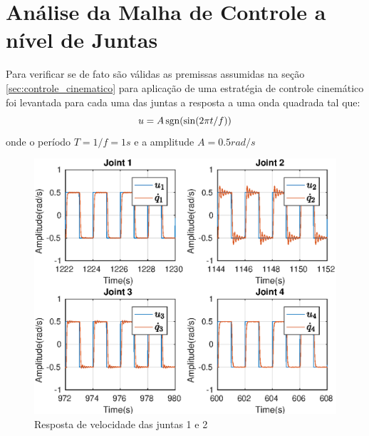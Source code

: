 \section{Análise da Malha de Controle a nível de Juntas}
Para verificar se de fato são válidas as premissas assumidas na seção \ref{sec:controle_cinematico} para aplicação de uma estratégia de controle cinemático foi levantada para cada uma das juntas a resposta a uma onda quadrada tal que:
\[ u = A \operatorname{sgn}(\sin( 2\pi t/f)) \]
onde o período $T = 1/f = 1s$ e a amplitude $A = 0.5 rad/s$

\newlength{\imageheight}
\begin{figure}[H]
  \centering
    \includegraphics[width=\textwidth, clip=true, trim = 0 0.5\imageheight 0 0 0 mm]{./img/internal_loop}
  \caption{Resposta de velocidade das juntas 1 e 2}
\end{figure}

